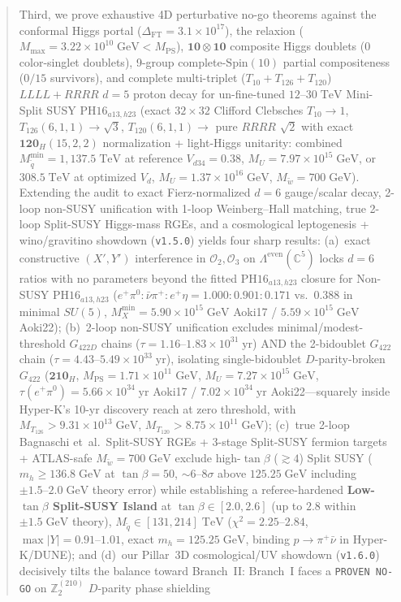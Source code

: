\documentclass[11pt,a4paper]{article}
\begin{document}
\begin{abstract}
Third, we prove exhaustive 4D perturbative no-go theorems against the conformal Higgs portal ($\Delta_{\mathrm{FT}} = 3.1\times 10^{17}$), the relaxion ($M_{\max} = 3.22\times 10^{10}\;\mathrm{GeV} < M_{\mathrm{PS}}$), $\mathbf{10}\otimes\mathbf{10}$ composite Higgs doublets (0 color-singlet doublets), 9-group complete-$\mathrm{Spin}(10)$ partial compositeness ($0/15$ survivors), and complete multi-triplet ($T_{10}+T_{126}+T_{120}$) $LLLL+RRRR$ $d=5$ proton decay for un-fine-tuned $12\text{--}30\;\mathrm{TeV}$ Mini-Split SUSY $\mathrm{PH16}_{a13,h23}$ (exact $32\times 32$ Clifford Clebsches $T_{10}\to 1$, $T_{126}(6,1,1)\to\sqrt{3}$, $T_{120}(6,1,1)\to$ pure $RRRR$ $\sqrt{2}$ with exact $\mathbf{120}_H(15,2,2)$ normalization + light-Higgs unitarity: combined $M_{\tilde q}^{\min} = 1{,}137.5\;\mathrm{TeV}$ at reference $V_{d34}=0.38$, $M_U = 7.97\times 10^{15}\;\mathrm{GeV}$, or $308.5\;\mathrm{TeV}$ at optimized $V_d$, $M_U = 1.37\times 10^{16}\;\mathrm{GeV}$, $M_{\tilde w}=700\;\mathrm{GeV}$). Extending the audit to exact Fierz-normalized $d=6$ gauge/scalar decay, 2-loop non-SUSY unification with 1-loop Weinberg--Hall matching, true 2-loop Split-SUSY Higgs-mass RGEs, and a cosmological leptogenesis + wino/gravitino showdown (\texttt{v1.5.0}) yields four sharp results: (a)~exact constructive $(X',Y')$ interference in $\mathcal{O}_2, \mathcal{O}_3$ on $\Lambda^{\mathrm{even}}(\mathbb{C}^5)$ locks $d=6$ ratios with no parameters beyond the fitted $\mathrm{PH16}_{a13,h23}$ closure for Non-SUSY $\mathrm{PH16}_{a13,h23}$ ($e^+\pi^0 : \bar\nu\pi^+ : e^+\eta = 1.000 : 0.901 : 0.171$ vs.\ $0.388$ in minimal $SU(5)$, $M_X^{\min}=5.90\times 10^{15}\;\mathrm{GeV}$ Aoki17 / $5.59\times 10^{15}\;\mathrm{GeV}$ Aoki22); (b)~2-loop non-SUSY unification excludes minimal/modest-threshold $G_{422D}$ chains ($\tau = 1.16\text{--}1.83\times 10^{31}\;\mathrm{yr}$) AND the 2-bidoublet $G_{422}$ chain ($\tau = 4.43\text{--}5.49\times 10^{33}\;\mathrm{yr}$), isolating single-bidoublet $D$-parity-broken $G_{422}$ ($\mathbf{210}_H$, $M_{\mathrm{PS}} = 1.71\times 10^{11}\;\mathrm{GeV}$, $M_U = 7.27\times 10^{15}\;\mathrm{GeV}$, $\tau(e^+\pi^0) = 5.66\times 10^{34}\;\mathrm{yr}$ Aoki17 / $7.02\times 10^{34}\;\mathrm{yr}$ Aoki22---squarely inside Hyper-K's 10-yr discovery reach at zero threshold, with $M_{T_{126}} > 9.31\times 10^{13}\;\mathrm{GeV}$, $M_{T_{120}} > 8.75\times 10^{11}\;\mathrm{GeV}$); (c)~true 2-loop Bagnaschi et~al.\ Split-SUSY RGEs + 3-stage Split-SUSY fermion targets + ATLAS-safe $M_{\tilde w}=700\;\mathrm{GeV}$ exclude high-$\tan\beta$ ($\gtrsim 4$) Split SUSY ($m_h \ge 136.8\;\mathrm{GeV}$ at $\tan\beta=50$, $\sim 6\text{--}8\sigma$ above $125.25\;\mathrm{GeV}$ including $\pm 1.5\text{--}2.0\;\mathrm{GeV}$ theory error) while establishing a referee-hardened \textbf{Low-$\tan\beta$ Split-SUSY Island} at $\tan\beta \in [2.0, 2.6]$ (up to $2.8$ within $\pm 1.5\;\mathrm{GeV}$ theory), $M_{\tilde q} \in [131, 214]\;\mathrm{TeV}$ ($\chi^2 = 2.25\text{--}2.84$, $\max|Y|=0.91\text{--}1.01$, exact $m_h = 125.25\;\mathrm{GeV}$, binding $p\to\pi^+\bar\nu$ in Hyper-K/DUNE); and (d)~our Pillar~3D cosmological/UV showdown (\texttt{v1.6.0}) decisively tilts the balance toward Branch~II: Branch~I faces a \texttt{PROVEN NO-GO} on $\mathbb{Z}_2^{(210)}$ $D$-parity phase shielding 
\end{abstract}
\end{document}
